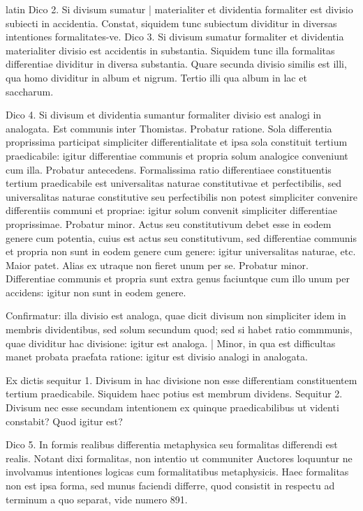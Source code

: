 \begin{otherlanguage*}{latin}
\pstart
Dico 2. Si divisum sumatur \textnormal{|} materialiter et dividentia formaliter est divisio subiecti in accidentia. Constat, siquidem tunc subiectum dividitur in diversas intentiones formalitates-ve. Dico 3. Si divisum sumatur formaliter et dividentia materialiter divisio est accidentis in substantia. Siquidem tunc illa formalitas differentiae dividitur in diversa substantia. Quare secunda divisio similis est illi, qua  homo dividitur in album et nigrum. Tertio illi qua album in lac et saccharum. 
\pend

\pstart
Dico 4. Si divisum et dividentia sumantur formaliter divisio est analogi in analogata. Est communis inter Thomistas. Probatur ratione. Sola differentia proprissima participat simpliciter differentialitate et ipsa sola constituit tertium praedicabile:
igitur differentiae communis et propria solum analogice conveniunt cum illa. Probatur antecedens. Formalissima ratio differentiaee constituentis tertium praedicabile est universalitas naturae constitutivae et perfectibilis, sed universalitas naturae constitutive seu perfectibilis non potest simpliciter convenire differentiis communi et propriae:
igitur solum convenit simpliciter differentiae proprissimae. Probatur minor. Actus seu constitutivum debet esse in eodem genere cum potentia, cuius est actus seu constitutivum, sed differentiae communis et propria non sunt in eodem genere cum genere:
igitur universalitas naturae, etc. Maior patet. Alias ex utraque non fieret unum per se. Probatur minor. Differentiae communis et propria sunt extra genus faciuntque cum illo unum per accidens:
igitur non sunt in eodem genere. 
\pend

\pstart
Confirmatur:
illa divisio est analoga, quae dicit divisum non simpliciter idem in membris dividentibus, sed solum secundum quod; sed si habet ratio commmunis, quae dividitur hac divisione:
igitur est analoga. \textnormal{|} Minor, in qua est difficultas manet probata praefata ratione:
igitur est divisio analogi in analogata. 
\pend

\pstart
Ex dictis sequitur 1. Divisum in hac divisione non esse differentiam constituentem tertium praedicabile. Siquidem haec potius est membrum dividens. Sequitur 2. Divisum nec esse secundam intentionem ex quinque praedicabilibus ut videnti constabit? Quod igitur est? 
\pend

\pstart
Dico 5. In formis realibus differentia metaphysica seu formalitas differendi est realis. Notant dixi formalitas, non intentio ut communiter Auctores loquuntur ne involvamus intentiones logicas cum formalitatibus metaphysicis. Haec formalitas non est ipsa forma, sed munus faciendi differre, quod consistit in respectu ad terminum a quo separat, vide numero 891. 
\pend


\end{otherlanguage*}
